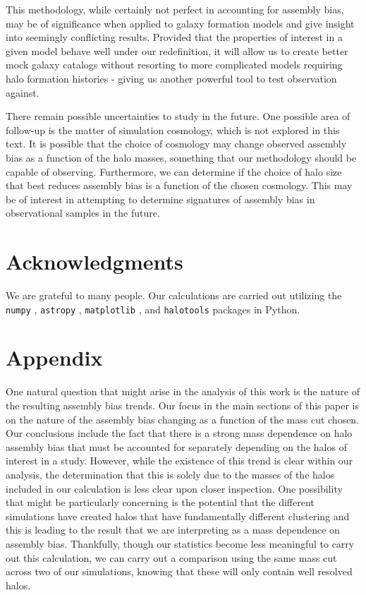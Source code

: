 \documentclass[usenatbib,fleqn]{mnras}
\begin{document}
This methodology, while certainly not perfect in accounting for assembly bias, may be of significance when
applied to galaxy formation models and give insight into seemingly conflicting results. Provided that the
properties of interest in a given model behave well under our redefinition, it will allow us to create better
mock galaxy catalogs without resorting to more complicated models requiring halo formation histories - giving us
another powerful tool to test observation against.

There remain possible uncertainties to study in the future. One possible area of follow-up is the matter of
simulation cosmology, which is not explored in this text. It is possible that the choice of cosmology may change
observed assembly bias as a function of the halo masses, something that our methodology should be capable of
observing. Furthermore, we can determine if the choice of halo size that best reduces assembly bias is a function
of the chosen cosmology. This may be of interest in attempting to determine signatures of assembly bias in
observational samples in the future.

\section*{Acknowledgments}

We are grateful to many people. Our calculations are carried out utilizing the
{\tt numpy} \citep{numpy}, {\tt astropy} \citep{astropy}, {\tt matplotlib} 
\citep{matplotlib}, and {\tt halotools} \citep{halotools} packages in Python.



\section*{Appendix}
\label{section:appendix_massres}

One natural question that might arise in the analysis of this work is the nature of the resulting assembly bias
trends. Our focus in the main sections of this paper is on the nature of the assembly bias changing as a function
of the mass cut chosen. Our conclusions include the fact that there is a strong mass dependence on halo assembly
bias that must be accounted for separately depending on the halos of interest in a study. However, while the
existence of this trend is clear within our analysis, the determination that this is solely due to the masses of
the halos included in our calculation is less clear upon closer inspection. One possibility that might be
particularly concerning is the potential that the different simulations have created halos that have
fundamentally different clustering and this is leading to the result that we are interpreting as a mass
dependence on assembly bias. Thankfully, though our statistics become less meaningful to carry out this
calculation, we can carry out a comparison using the same mass cut across two of our simulations, knowing that
these will only contain well resolved halos.
\end{document}
